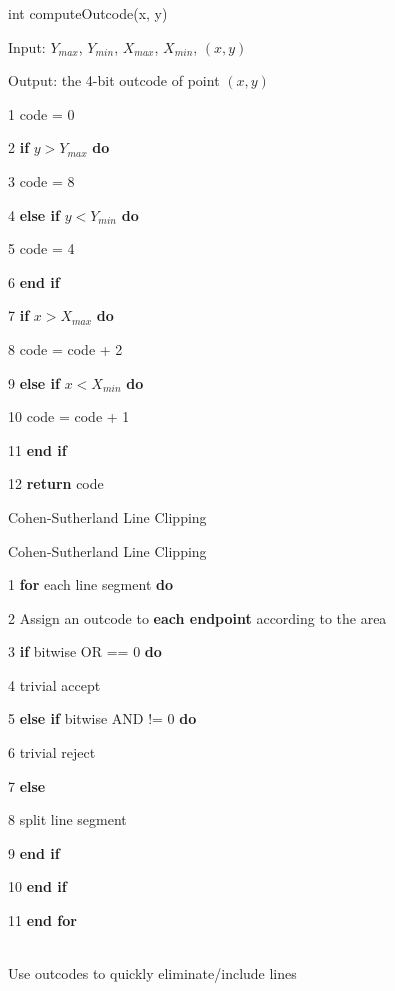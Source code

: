 \documentclass[]{report}
\begin{document}
\begin{algorithm}[h]
	\caption{int computeOutcode(x, y)}
	\begin{algorithmic}[1]
		\item[Input:] $Y_{max}$, $Y_{min}$, $X_{max}$, $X_{min}$, $(x, y)$
		\item[Output:] the 4-bit outcode of point $(x, y)$
		\item[1] code = 0
		\item[2] \textbf{if} $y > Y_{max}$ \textbf{do}
		\item[3] code = 8
		\item[4] \textbf{else if} $y < Y_{min}$ \textbf{do}
		\item[5] code = 4
		\item[6] \textbf{end if}
		\item[7] \textbf{if} $x > X_{max}$ \textbf{do}
		\item[8] code = code + 2
		\item[9] \textbf{else if} $x < X_{min}$ \textbf{do}
		\item[10] code = code + 1
		\item[11] \textbf{end if}
		\item[12] \textbf{return} code
	\end{algorithmic}
\end{algorithm}
Cohen-Sutherland Line Clipping\\
\begin{algorithm}[h]
	\caption{Cohen-Sutherland Line Clipping}
	\begin{algorithmic}[1]
		\item[1] \textbf{for} each line segment \textbf{do}
		\item[2] Assign an outcode to \textbf{each endpoint} according to the area
		\item[3] \textbf{if} bitwise OR == 0 \textbf{do}
		\item[4] trivial accept
		\item[5] \textbf{else if} bitwise AND != 0 \textbf{do}
		\item[6] trivial reject
		\item[7] \textbf{else}
		\item[8] split line segment
		\item[9] \textbf{end if}
		\item[10] \textbf{end if}
		\item[11] \textbf{end for}
	\end{algorithmic}
\end{algorithm}
\\
Use outcodes to quickly eliminate/include lines
\end{document}
